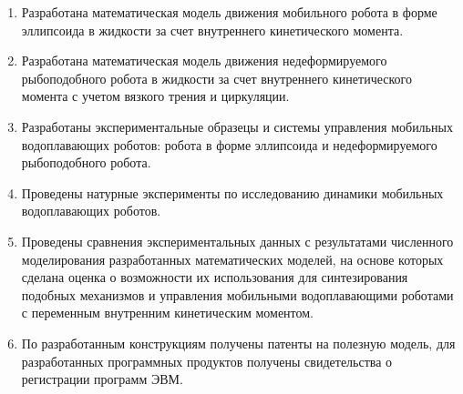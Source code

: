 \begin{enumerate}
  \item Разработана математическая модель движения мобильного робота в форме эллипсоида в жидкости за счет внутреннего кинетического момента.
  \item Разработана математическая модель движения недеформируемого рыбоподобного робота в жидкости за счет внутреннего кинетического момента с учетом вязкого трения и циркуляции.
  \item Разработаны экспериментальные образецы и системы управления мобильных водоплавающих роботов: робота в форме эллипсоида и недеформируемого рыбоподобного робота.
  \item Проведены натурные эксперименты по исследованию динамики мобильных водоплавающих роботов.
  \item Проведены сравнения экспериментальных данных с результатами численного моделирования разработанных математических моделей, на основе которых сделана оценка о возможности их использования для синтезирования подобных механизмов и управления мобильными водоплавающими роботами с переменным внутренним кинетическим моментом.
  \item По разработанным конструкциям получены патенты на полезную модель, для разработанных программных продуктов получены свидетельства о регистрации программ ЭВМ.
\end{enumerate}
